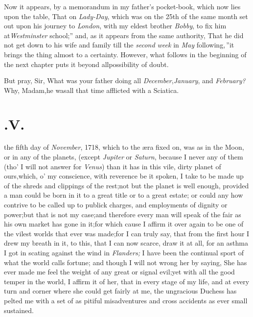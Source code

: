\documentclass{article}
\begin{document}
Now it appears, by a memorandum in my father’s pocket-book, which now lies upon
the table, \lqq That on \textit{Lady-Day}, which was on the 25th of
the same month 
set out upon his journey to \textit{London}, with my eldest brother
\textit{Bobby}, to fix him at\break\textit{Westminster} school;” and,
as it appears from the same authority, \lqq That he did not get
down to his wife and family till the \textit{second week} in
\textit{May} following,\,”\tsk  it brings the thing almost to a
certainty.\break
However, what follows in the beginning of the next
chapter puts it beyond all\break possibility of doubt.

\tsh  But pray, Sir, What was your father doing
all \textit{December},\tsk\textit{January}, and
\textit{February?}\tsh  Why, Madam,\tsk  he was\break all that
time afflicted with a Sciatica.
\hfill{}

\section{.\enspace V.}

 the fifth day of \textit{November},
1718, which to the æra fixed on, was as\break 
{}
\break
{}
in the Moon, or in any of the
planets, (except \textit{Jupiter} or \textit{Saturn}, because I never
 any of them (tho’ I will not answer for \textit{Venus})
than it has in this vile, dirty pla\-net of ours,\tsk  which,
o’ my conscience, with reverence be it spoken, I take to be
made up of the shreds and clippings of the rest;\tsh  not
but the planet is well enough, provided a man could be born in it
to a great title or to a great estate; or could any how contrive to
be called up to publick charges, and employments of dignity or
power;\tsh  but that is not my case;\tsh  and
therefore every man will speak of the fair as his own market has
gone in it;\tsk  for which cause I affirm it over
again to be one of the vilest worlds that ever was made;\tsk  for
I can truly say, that from the first hour I drew my breath in it,
to this, that I can now scarce, draw it at all, for an asthma I got
in scating against the wind in \textit{Flanders;}\tsk\break
I have been the continual sport of what the world calls fortune; and though I will
not wrong her by saying, She has ever made me feel the weight of any great or signal
evil;\tsk  yet with all the good temper in the world, I affirm it of her, that in
every stage of my life, and at every turn and corner where she could get fairly
at me, the ungracious Duchess has pelted me with a set of as pitiful misadventures
and cross accidents as ever small  sustained.
\end{document}
